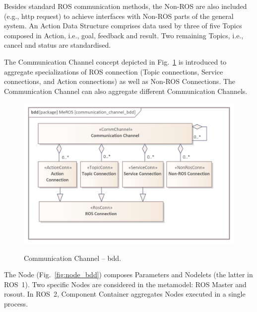 Besides standard ROS communication methods, the Non-ROS are also included (e.g., http request) to achieve interfaces with Non-ROS parts of the general system. An Action Data Structure comprises data used by three of five Topics composed in Action, i.e., goal, feedback and result. Two remaining Topics, i.e., cancel and status are standardised.

The Communication Channel \cite{palka2022communication} concept depicted in Fig.~\ref{fig:communication_channel_bdd} is introduced to aggregate specializations of ROS connection (Topic connections, Service connections, and Action connections) as well as Non-ROS Connections. The Communication Channel can also aggregate different Communication Channels.


\begin{figure}[H]
    \centering
    \begin{center}
    {\includegraphics[scale=0.95]{../imgs/meros_pkg/communication_channel_bdd.png}}
    \end{center}
    \caption{Communication Channel -- bdd.}
    \label{fig:communication_channel_bdd}
\end{figure}

The Node (Fig.~\ref{fig:node_bdd}) composes Parameters and Nodelets (the latter in ROS~1). Two specific Nodes are considered in the metamodel: ROS Master and rosout. In ROS~2, Component Container aggregates Nodes executed in a single process.


